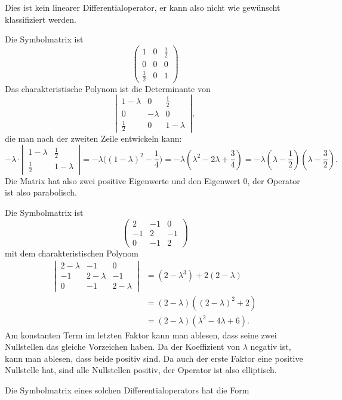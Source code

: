 \begin{loesung}
\begin{teilaufgaben}
\item Dies ist kein linearer Differentialoperator, er kann also nicht
wie gewünscht klassifiziert werden.
\item Die Symbolmatrix ist
\[
\begin{pmatrix}
1&0&\frac12\\
0&0&0\\
\frac12&0&1
\end{pmatrix}
\]
Das charakteristische Polynom ist die Determinante von
\[
\left|\,\begin{matrix}
1-\lambda&0&\frac12\\
0&-\lambda&0\\
\frac12&0&1-\lambda
\end{matrix}
\,\right|,
\]
die man nach der zweiten Zeile entwickeln kann:
\[
-\lambda\cdot\left|\,
\begin{matrix}1-\lambda&\frac12\\\frac12&1-\lambda\end{matrix}
\,\right|
=
-\lambda\biggl((1-\lambda)^2-\frac14\biggr)
=
-\lambda\left(\lambda^2-2\lambda+\frac34\right)
=
-\lambda(\lambda-\frac12)(\lambda-\frac32).
\]
Die Matrix hat also zwei positive Eigenwerte und den Eigenwert $0$,
der Operator ist also parabolisch.
\item Die Symbolmatrix ist
\[
\begin{pmatrix}
2&-1&0\\
-1&2&-1\\
0&-1&2
\end{pmatrix}
\]
mit dem charakteristischen Polynom
\begin{align*}
\left|\,
\begin{matrix}
2-\lambda&-1&0\\
-1&2-\lambda&-1\\
0&-1&2-\lambda
\end{matrix}\,\right|
&=(2-\lambda^3)+2(2-\lambda)
\\
&=(2-\lambda)((2-\lambda)^2+2)
\\
&=(2-\lambda)(\lambda^2-4\lambda+6).
\end{align*}
Am konstanten Term im letzten Faktor kann man ablesen, dass
seine zwei Nullstellen das gleiche Vorzeichen haben. Da der
Koeffizient von $\lambda$ negativ ist, kann man ablesen, dass
beide positiv sind. Da auch der erste Faktor eine positive
Nullstelle hat, sind alle Nullstellen positiv, der Operator ist
also elliptisch.
\item Die Symbolmatrix eines solchen Differentialoperators hat die Form

\end{teilaufgaben}
\end{loesung}
